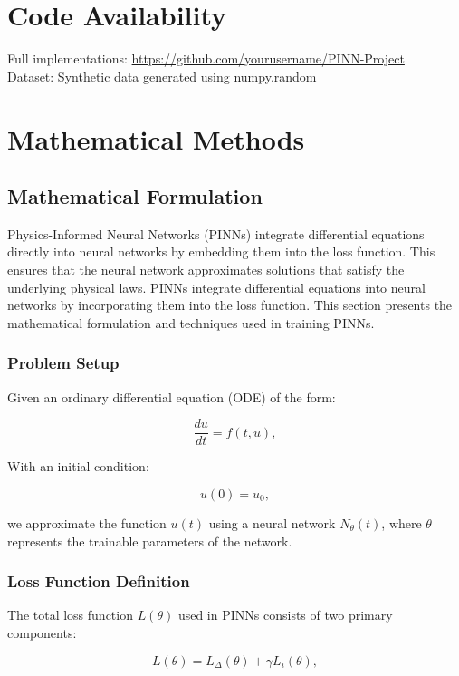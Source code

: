 \documentclass{article}
\begin{document}
\section*{Code Availability}
Full implementations: \url{https://github.com/yourusername/PINN-Project} \\
Dataset: Synthetic data generated using numpy.random

\section{Mathematical Methods}

\subsection{Mathematical Formulation}
Physics-Informed Neural Networks (PINNs) integrate differential equations directly into neural networks by embedding them into the loss function. This ensures that the neural network approximates solutions that satisfy the underlying physical laws. 
PINNs integrate differential equations into neural networks by incorporating them into the loss function. This section presents the mathematical formulation and techniques used in training PINNs.

\subsubsection{Problem Setup}
Given an ordinary differential equation (ODE) of the form:

\begin{equation}
    \frac{du}{dt} = f(t, u),
\end{equation}

With an initial condition:

\begin{equation}
    u(0) = u_0,
\end{equation}

we approximate the function $u(t)$ using a neural network $N_{\theta}(t)$, where $\theta$ represents the trainable parameters of the network.

\subsubsection{Loss Function Definition}
The total loss function $L(\theta)$ used in PINNs consists of two primary components:

\begin{equation}
    L(\theta) = L_{\Delta}(\theta) + \gamma L_{i}(\theta),
\end{equation}
\end{document}
